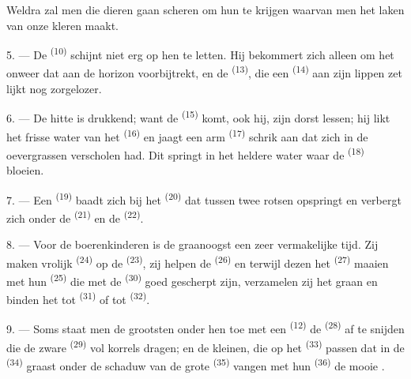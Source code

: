 Weldra zal men die dieren gaan scheren om hun  te krijgen waarvan men het laken
van onze kleren maakt.

\VUsaut{5.0mm}
\VUsaut{3.4mm}

5. --- De  \textsuperscript{(10)} schijnt niet erg op hen te letten. Hij
bekommert zich alleen om het onweer dat aan de horizon voorbijtrekt, en de
 \textsuperscript{(13)}, die een  \textsuperscript{(14)}
aan zijn lippen zet lijkt nog zorgelozer.

6. --- De hitte is drukkend; want de  \textsuperscript{(15)} komt, ook hij, zijn
dorst lessen; hij likt het frisse water van het  \textsuperscript{(16)} en
jaagt een arm  \textsuperscript{(17)} schrik aan dat zich in de oevergrassen
verscholen had. Dit springt in het heldere water waar de 
\textsuperscript{(18)} bloeien.

7. --- Een  \textsuperscript{(19)} baadt zich bij het
 \textsuperscript{(20)} dat tussen twee rotsen opspringt en
verbergt zich onder de  \textsuperscript{(21)} en de
 \textsuperscript{(22)}.

\VUsaut{5.0mm}
\VUsaut{3.4mm}

8. --- Voor de boerenkinderen is de graanoogst een zeer vermakelijke tijd. Zij maken vrolijk
 \textsuperscript{(24)} op de
 \textsuperscript{(23)}, zij helpen de 
\textsuperscript{(26)} en terwijl dezen het  \textsuperscript{(27)} maaien
met hun  \textsuperscript{(25)} die met de 
\textsuperscript{(30)} goed gescherpt zijn, verzamelen zij het graan en binden het tot
 \textsuperscript{(31)} of tot
 \textsuperscript{(32)}.

9. --- Soms staat men de grootsten onder hen toe met een 
\textsuperscript{(12)} de  \textsuperscript{(28)} af te snijden die de
zware  \textsuperscript{(29)} vol korrels dragen; en de kleinen, die op het
 \textsuperscript{(33)} passen dat in de
 \textsuperscript{(34)} graast onder de schaduw van de grote
 \textsuperscript{(35)} vangen met hun 
\textsuperscript{(36)} de mooie .

